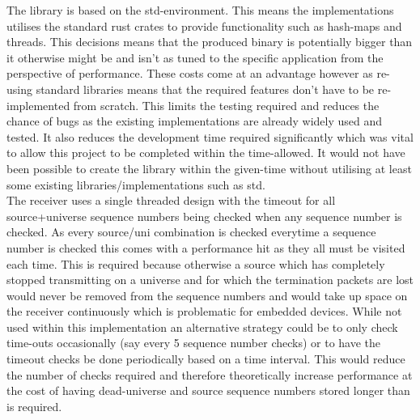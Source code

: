 \documentclass[11pt,a4paper]{article}
\begin{document}
The library is based on the std-environment. This means the implementations utilises the standard rust crates to provide functionality such as hash-maps and threads. This decisions means that the produced binary is potentially bigger than it otherwise might be and isn't as tuned to the specific application from the perspective of performance. These costs come at an advantage however as re-using standard libraries means that the required features don't have to be re-implemented from scratch. This limits the testing required and reduces the chance of bugs as the existing implementations are already widely used and tested. It also reduces the development time required significantly which was vital to allow this project to be completed within the time-allowed. It would not have been possible to create the library within the given-time without utilising at least some existing libraries/implementations such as std.\\

The receiver uses a single threaded design with the timeout for all source+universe sequence numbers being checked when any sequence number is checked. As every source/uni combination is checked everytime a sequence number is checked this comes with a performance hit as they all must be visited each time. This is required because otherwise a source which has completely stopped transmitting on a universe and for which the termination packets are lost would never be removed from the sequence numbers and would take up space on the receiver continuously which is problematic for embedded devices. While not used within this implementation an alternative strategy could be to only check time-outs occasionally (say every 5 sequence number checks) or to have the timeout checks be done periodically based on a time interval. This would reduce the number of checks required and therefore theoretically increase performance at the cost of having dead-universe and source sequence numbers stored longer than is required.\\
\end{document}
